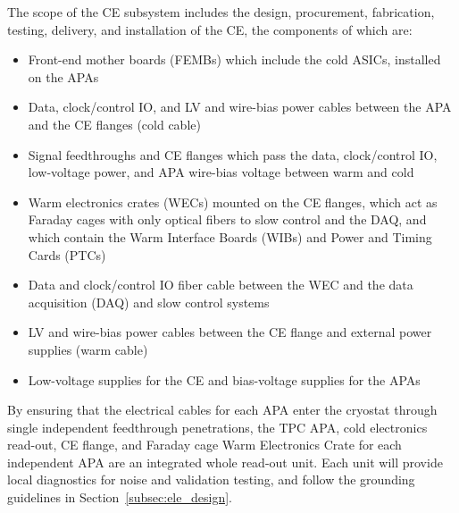 The scope of the CE subsystem includes the design, procurement, fabrication, testing,
delivery, and installation of the CE, the components of which are:
\begin{itemize}
\item Front-end mother boards (FEMBs) which include the cold ASICs, installed on the APAs
\item Data, clock/control IO, and LV and wire-bias power cables 
between the APA and the CE flanges (cold cable)
\item Signal feedthroughs and CE flanges which pass the data, clock/control IO, 
low-voltage power, and APA wire-bias voltage between warm and cold
\item Warm electronics crates (WECs) mounted on the CE flanges, which act as Faraday cages with
only optical fibers to slow control and the DAQ, and which contain the Warm Interface Boards (WIBs)
and Power and Timing Cards (PTCs)
\item Data and clock/control IO fiber cable between the WEC and the data acquisition 
(DAQ) and slow control systems
\item LV and wire-bias power cables between the CE flange and external power supplies (warm cable)
\item Low-voltage supplies for the CE and bias-voltage supplies for the APAs
\end{itemize}


By ensuring that the electrical cables for each APA enter the cryostat through single 
independent feedthrough penetrations, the TPC APA, cold electronics read-out, CE flange, 
and Faraday cage Warm Electronics Crate for each independent APA are an integrated whole
read-out unit. Each unit will provide local diagnostics for noise and validation testing,
and follow the grounding guidelines in Section~\ref{subsec:ele_design}.

%


